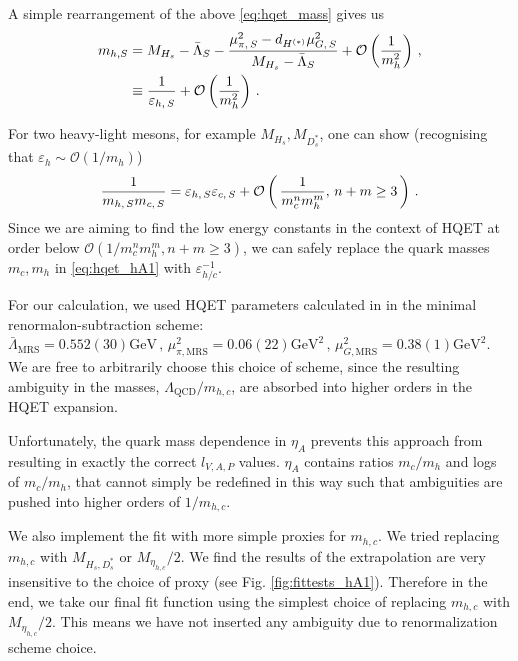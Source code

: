 A simple rearrangement of the above \eqref{eq:hqet_mass} gives us
\begin{align}
  \label{eq:epsilon_h}
  m_{h,S} &= M_{H_s} - \bar{\Lambda}_S - { \mu^2_{\pi,\,S} - d_{H^{(*)}} \mu^2_{G,\,S} \over M_{H_s} - \bar{\Lambda}_S} + \mathcal{O}\left({1\over m_h^2}\right)\,, \\ \nonumber
  & \equiv {1\over\varepsilon_{h,\,S}} + \mathcal{O}\left({1\over m_h^2}\right)\,.
\end{align}

For two heavy-light mesons, for example $M_{H_s},M_{D_s^*}$, one can show (recognising that $\varepsilon_{h}\sim \mathcal{O}(1/m_h)$)
\begin{align}
  {1\over m_{h,\,S} m_{c,\,S}} = \varepsilon_{h,\,S}\varepsilon_{c,\,S} + \mathcal{O}\left( \, {1\over m_c^n m_h^m}, \, n+m\geq 3 \, \right)\,.
\end{align}
Since we are aiming to find the low energy constants in the context of HQET at order below $\mathcal{O}( 1/ m_c^n m_h^m, n+m\geq 3 )$, we can safely replace the quark masses $m_c,m_h$ in \eqref{eq:hqet_hA1} with $\varepsilon_{h/c}^{-1}$.

For our calculation, we used HQET parameters calculated in \cite{Bazavov:2018omf} in the minimal renormalon-subtraction scheme: $\bar{\Lambda}_{\text{MRS}} = 0.552(30)\text{GeV} \,,\, \mu^2_{\pi,\text{MRS}} = 0.06(22)\text{GeV}^2 \,, \, \mu^2_{G,\text{MRS}} = 0.38(1)\text{GeV}^2$. We are free to arbitrarily choose this choice of scheme, since the resulting ambiguity in the masses, $\Lambda_{\text{QCD}}/m_{h,c}$, are absorbed into higher orders in the HQET expansion.

Unfortunately, the quark mass dependence in $\eta_A$ prevents this approach from resulting in exactly the correct $l_{V,A,P}$ values. $\eta_A$ contains ratios $m_c/m_h$ and logs of $m_c/m_h$, that cannot simply be redefined in this way such that ambiguities are pushed into higher orders of $1/m_{h,c}$.

We also implement the fit with more simple proxies for $m_{h,c}$. We tried replacing $m_{h,c}$ with $M_{H_s,D^*_s}$ or $M_{\eta_{h,c}}/2$. We find the results of the extrapolation are very insensitive to the choice of proxy (see Fig. \ref{fig:fittests_hA1}). Therefore in the end, we take our final fit function using the simplest choice of replacing $m_{h,c}$ with $M_{\eta_{h,c}}/2$. This means we have not inserted any ambiguity due to renormalization scheme choice.


